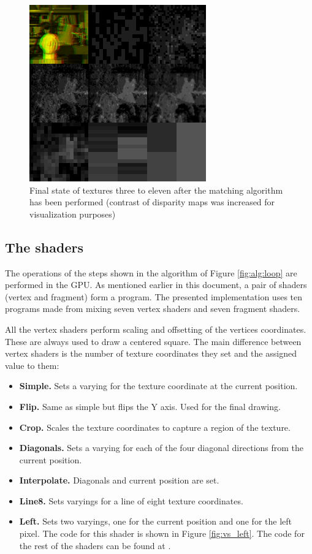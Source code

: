 \documentclass[conference]{IEEEtran}
\begin{document}
\begin{figure}[!t]
 \centering
 \includegraphics[width=3.0in]{texturesfinal}
 \caption{Final state of textures three to eleven after the matching algorithm has been performed (contrast of disparity maps was increased for visualization purposes)}
 \label{fig:texturesfinal}
\end{figure}

 \subsection{The shaders}
The operations of the steps shown in the algorithm of Figure \ref{fig:alg:loop} are performed in the GPU. As mentioned earlier in this document, a pair of shaders (vertex and fragment) form a program. The presented implementation uses ten programs made from mixing seven vertex shaders and seven fragment shaders.

All the vertex shaders perform scaling and offsetting of the vertices coordinates. These are always used to draw a centered square. The main difference between vertex shaders is the number of texture coordinates they set and the assigned value to them:

\begin{itemize}
 \item {\bfseries Simple.} Sets a varying for the texture coordinate at the current position.
 \item {\bfseries Flip.} Same as simple but flips the Y axis. Used for the final drawing.
 \item {\bfseries Crop.} Scales the texture coordinates to capture a region of the texture.
 \item {\bfseries Diagonals.} Sets a varying for each of the four diagonal directions from the current position.
 \item {\bfseries Interpolate.} Diagonals and current position are set.
 \item {\bfseries Line8.} Sets varyings for a line of eight texture coordinates.
 \item {\bfseries Left.} Sets two varyings, one for the current position and one for the left pixel. The code for this shader is shown in Figure \ref{fig:vs_left}. The code for the rest of the shaders can be found at \cite{paguiar14}.
\end{itemize}
\end{document}
